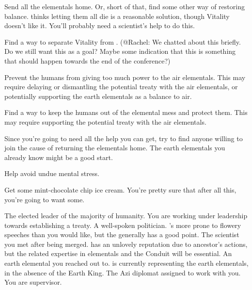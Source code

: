 \documentclass[char]{elementals}
\begin{document}
\begin{itemz}[Goals]
	\item  Send all the elementals home.  Or, short of that, find some other way of restoring balance.  \cAvatar{} thinks letting them all die is a reasonable solution, though Vitality doesn't like it.  You'll probably need a scientist's help to do this.
	\item  Find a way to separate Vitality from \cAvatar{}. (@Rachel: We chatted about this briefly. Do we still want this as a goal? Maybe some indication that this is something that should happen towards the end of the conference?)
	\item  Prevent the humans from giving too much power to the air elementals.  This may require delaying or dismantling the potential treaty with the air elementals, or potentially supporting the earth elementals as a balance to air.
	\item  Find a way to keep the humans out of the elemental mess and protect them.  This may require supporting the potential treaty with the air elementals.
	\item  Since you're going to need all the help you can get, try to find anyone willing to join the cause of returning the elementals home.  The earth elementals you already know might be a good start.
	\item  Help \cDiplomat{} avoid undue mental stress.
	\item  Get some mint-chocolate chip ice cream.  You're pretty sure that after all this, you're going to want some.
\end{itemz}

\begin{contacts}
	\contact{\cLeader{}}  The elected leader of the majority of humanity.  You are working under \cLeader{\their} leadership towards establishing a treaty.
	\contact{\cDema{}}  A well-spoken politician.  \cDema{\They}'s more prone to flowery speeches than you would like, but the \cDema{\human} generally has a good point.
	\contact{\cGD{}}  The scientist you met after being merged.  \cGD{\They} has an unlovely reputation due to \cGD{\their} ancestor's actions, but the related expertise in elementals and the Conduit will be essential.
	\contact{\cLoyal{}}  An earth elemental you reached out to.  \cLoyal{\They} is currently representing the earth elementals, in the absence of the Earth King.
	\contact{\cDiplomat{}}  The Azi diplomat assigned to work with you.  You are \cDiplomat{\their} supervisor.
\end{contacts}
\end{document}
